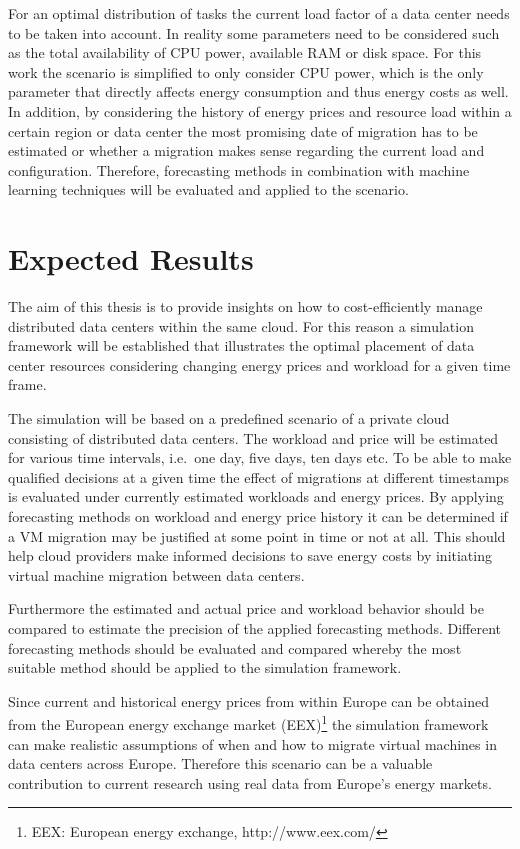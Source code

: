 \documentclass[a4paper]{article}
\begin{document}
For an optimal distribution of tasks the current load factor of a data center needs to be taken into account. In reality some parameters need to be considered such as the total availability of CPU power, available RAM or disk space. For this work the scenario is simplified to only consider CPU power, which is the only parameter that directly affects energy consumption and thus energy costs as well. In addition, by considering the history of energy prices and resource load within a certain region or data center the most promising date of migration has to be estimated or whether a migration makes sense regarding the current load and configuration. Therefore, forecasting methods in combination with machine learning techniques will be evaluated and applied to the scenario. 



\section{Expected Results}

The aim of this thesis is to provide insights on how to cost-efficiently manage distributed data centers within the same cloud. For this reason a simulation framework will be established that illustrates the optimal placement of data center resources considering changing energy prices and workload for a given time frame. 

The simulation will be based on a predefined scenario of a private cloud consisting of distributed data centers. The workload and price will be estimated for various time intervals, i.e.\ one day, five days, ten days etc. To be able to make qualified decisions at a given time the effect of migrations at different timestamps is evaluated under currently estimated workloads and energy prices. By applying forecasting methods on workload and energy price history it can be determined if a VM migration may be justified at some point in time or not at all. This should help cloud providers make informed decisions to save energy costs by initiating virtual machine migration between data centers. 

Furthermore the estimated and actual price and workload behavior should be compared to estimate the precision of the applied forecasting methods. Different forecasting methods should be evaluated and compared whereby the most suitable method should be applied to the simulation framework. 

Since current and historical energy prices from within Europe can be obtained from the European energy exchange market (EEX)\footnote{EEX: European energy exchange, http://www.eex.com/}  the simulation framework can make realistic assumptions of when and how to migrate virtual machines in data centers across Europe. Therefore this scenario can be a valuable contribution to current research using real data from Europe’s energy markets. 
\end{document}
